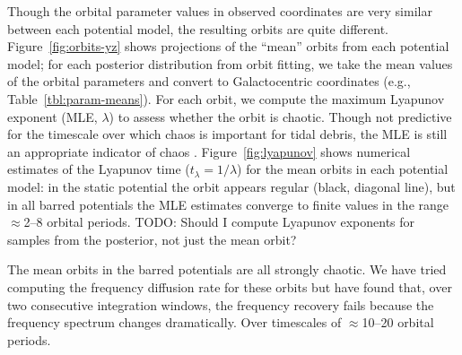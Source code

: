 \documentclass[letterpaper,12pt,preprint]{aastex}
\newcommand{\todo}[1]{{\color{red} TODO: #1}}
\begin{document}
Though the orbital parameter values in observed coordinates are very similar between each potential model, the resulting orbits are quite different. Figure~\ref{fig:orbits-yz} shows projections of the ``mean'' orbits from each potential model; for each posterior distribution from orbit fitting, we take the mean values of the orbital parameters and convert to Galactocentric coordinates (e.g., Table~\ref{tbl:param-means}). For each orbit, we compute the maximum Lyapunov exponent (MLE, $\lambda$) to assess whether the orbit is chaotic.  Though not predictive for the timescale over which chaos is important for tidal debris, the MLE is still an appropriate indicator of chaos \citep{apw15-chaos}. Figure~\ref{fig:lyapunov} shows numerical estimates of the Lyapunov time ($t_\lambda = 1/\lambda$) for the mean orbits in each potential model: in the static potential the orbit appears regular (black, diagonal line), but in all barred potentials the MLE estimates converge to finite values in the range $\approx$2--8 orbital periods. \todo{Should I compute Lyapunov exponents for samples from the posterior, not just the mean orbit?}

The mean orbits in the barred potentials are all strongly chaotic. We have tried computing the frequency diffusion rate for these orbits but have found that, over two consecutive integration windows, the frequency recovery fails because the frequency spectrum changes dramatically. Over timescales of $\approx$10--20 orbital periods.

\end{document}
